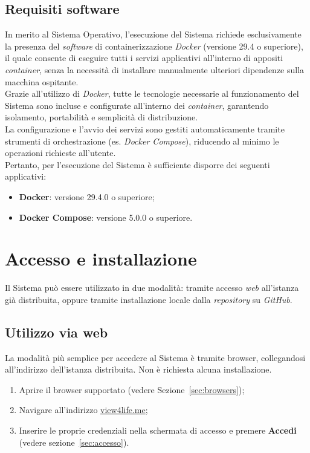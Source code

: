 \documentclass[10pt, letterpaper]{article}
\begin{document}
\subsection{Requisiti software}
In merito al Sistema Operativo, l'esecuzione del Sistema richiede esclusivamente la presenza del \textit{software} di containerizzazione \textit{Docker} (versione 29.4 o superiore), 
il quale consente di eseguire tutti i servizi applicativi all'interno di appositi \textit{container}, senza la necessità di installare manualmente ulteriori dipendenze sulla macchina ospitante.
\\Grazie all'utilizzo di \textit{Docker}, tutte le tecnologie necessarie al funzionamento del Sistema 
sono incluse e configurate all'interno dei \textit{container}, garantendo isolamento, portabilità e semplicità di distribuzione.
\\La configurazione e l'avvio dei servizi sono gestiti automaticamente tramite strumenti di orchestrazione (es. \textit{Docker Compose}), 
riducendo al minimo le operazioni richieste all'utente.
\\Pertanto, per l'esecuzione del Sistema è sufficiente disporre dei seguenti applicativi:
\begin{itemize}
    \item \textbf{Docker}: versione 29.4.0 o superiore;
    \item \textbf{Docker Compose}: versione 5.0.0 o superiore.
\end{itemize}


\section{Accesso e installazione}

Il Sistema può essere utilizzato in due modalità: tramite accesso \textit{web} all'istanza già distribuita, oppure tramite installazione locale dalla \textit{repository} su \textit{GitHub}.

\subsection{Utilizzo via web}
\label{sec:utilizzo-web}

La modalità più semplice per accedere al Sistema è tramite browser, collegandosi all'indirizzo dell'istanza distribuita.
Non è richiesta alcuna installazione.

\begin{enumerate}
    \item Aprire il browser supportato (vedere Sezione~\ref{sec:browsers});
    \item Navigare all'indirizzo \href{https://view4life.me}{view4life.me};
    \item Inserire le proprie credenziali nella schermata di accesso e premere \textbf{Accedi} (vedere sezione~\ref{sec:accesso}).
\end{enumerate}
\end{document}
